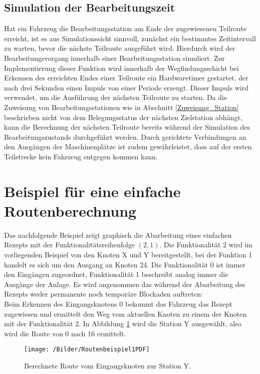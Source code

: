 		\subsection{Simulation der Bearbeitungszeit}
			\label{Simulation Station}
			Hat ein Fahrzeug die Bearbeitungsstation am Ende der zugewiesenen Teilroute erreicht, ist es aus Simulationssicht sinnvoll, zunächst ein bestimmtes Zeitintervall zu warten, bevor die nächste Teilroute ausgeführt wird. Hierdurch wird der Bearbeitungsvorgang innerhalb einer Bearbeitungsstation simuliert. Zur Implementierung dieser Funktion wird innerhalb der Wegfindungsschicht bei Erkennen des erreichten Endes einer Teilroute ein Hardwaretimer gestartet, der nach drei Sekunden einen Impuls von einer Periode erzeugt. Dieser Impuls wird verwendet, um die Ausführung der nächsten Teilroute zu starten. Da die Zuweisung von Bearbeitungsstationen wie in Abschnitt \ref{Zuweisung_Station} beschrieben nicht von dem Belegungsstatus der nächsten Zielstation abhängt, kann die Berechnung der nächsten Teilroute bereits während der Simulation des Bearbeitungszustands durchgeführt werden. Durch gerichtete Verbindungen an den Ausgängen der Maschinenplätze ist zudem gewährleistet, dass auf der ersten Teilstrecke kein Fahrzeug entgegen kommen kann.
	
		
	\section{Beispiel für eine einfache Routenberechnung}
	
		Das nachfolgende Beispiel zeigt graphisch die Abarbeitung eines einfachen Rezepts mit der Funktionalitätsreihenfolge $(2,1)$. Die Funktionalität 2 wird im vorliegenden Beispiel von den Knoten X und Y bereitgestellt, bei der Funktion 1 handelt es sich um den Ausgang an Knoten 24. Die Funktionalität 0 ist immer den Eingängen zugeordnet, Funktionalität 1 beschreibt analog immer die Ausgänge der Anlage. Es wird angenommen das während der Abarbeitung des Rezepts weder permanente noch temporäre Blockaden auftreten:
		\\[6pt]
		
		Beim Erkennen des Eingangsknotens 0 bekommt das Fahrzeug das Rezept zugewiesen und ermittelt den Weg vom aktuellen Knoten zu einem der Knoten mit der Funktionalität 2. In Abbildung \ref{Routenbeispiel1} wird die Station Y ausgewählt, also wird die Route von 0 nach 16 ermittelt.
		
		\begin{figure}[H]
			\centering
			\texttt{[image: /Bilder/Routenbeispiel1PDF]}
			\vspace{0.2cm}
			\caption{Berechnete Route vom Eingangsknoten zur Station Y.}\label{Routenbeispiel1}
		\end{figure}
		
